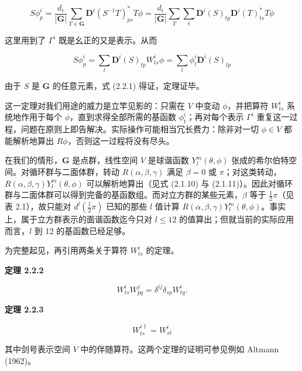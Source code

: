 \begin{equation*}
S\phi_{p}^{i} = \frac{d_{i}}{|\mathbf{G}|} \sum_{T \in \mathbf{G}} \mathbf{D}^{i}(S^{-1}T)_{ps}^{*} T\phi = \frac{d_{i}}{|\mathbf{G}|} \sum_{T}\sum_{t} \mathbf{D}^{i}(S)_{tp}\mathbf{D}^{i}(T)_{ts}^{*} T\phi
\tag{2.2.4}
\end{equation*}

这里用到了 $\Gamma^{i}$ 既是幺正的又是表示。从而

\begin{equation*}
S\phi_{p}^{i} = \sum_{t} \mathbf{D}^{i}(S)_{tp}W_{ts}^{i}\phi = \sum_{t} \phi_{t}^{i}\mathbf{D}^{i}(S)_{tp}
\tag{2.2.5}
\end{equation*}

由于 $S$ 是 $\mathbf{G}$ 的任意元素，式 (2.2.1) 得证，定理证毕。

这一定理对我们用途的威力是立竿见影的：只需在 $V$ 中变动 $\phi$，并把算符 $W_{ts}^{i}$ 系统地作用于每个 $\phi$，直到求得全部所需的基函数 $\phi_{t}^{i}$；再对每个表示 $\Gamma^{i}$ 重复这一过程，问题在原则上即告解决。实际操作可能相当冗长费力：除非对一切 $\phi \in V$ 都能解析地算出 $R\phi$，否则这一过程将没有尽头。

在我们的情形，$\mathbf{G}$ 是点群，线性空间 $V$ 是球谐函数 $Y_{l}^{m}(\theta, \phi)$ 张成的希尔伯特空间。对循环群与二面体群，转动 $R(\alpha, \beta, \gamma)$ 满足 $\beta = 0$ 或 $\pi$；对这类转动，$R(\alpha, \beta, \gamma)Y_{l}^{m}(\theta, \phi)$ 可以解析地算出（见式 (2.1.10) 与 (2.1.11)）。因此对循环群与二面体群可以得到完备的基函数组。而对立方群的某些元素，$\beta$ 等于 $\tfrac{1}{2}\pi$（见表 2.1），故只能对 $d^{l}(\tfrac{1}{2}\pi)$ 已知的那些 $l$ 值计算 $R(\alpha, \beta, \gamma)Y_{l}^{m}(\theta, \phi)$。事实上，属于立方群表示的面谐函数迄今只对 $l \leqslant 12$ 的值算出；但就当前的实际应用而言，$l$ 到 12 的基函数已经足够。

为完整起见，再引用两条关于算符 $W_{ts}^{i}$ 的定理。

\textbf{定理 2.2.2}

\begin{equation*}
W_{ts}^{i}W_{pq}^{j} = \delta^{ij}\delta_{sp}W_{tq}^{i}.
\tag{2.2.6}
\end{equation*}

\textbf{定理 2.2.3}

\begin{equation*}
W_{ts}^{i\dagger} = W_{st}^{i}
\tag{2.2.7}
\end{equation*}

其中剑号表示空间 $V$ 中的伴随算符。这两个定理的证明可参见例如 Altmann (1962)。

